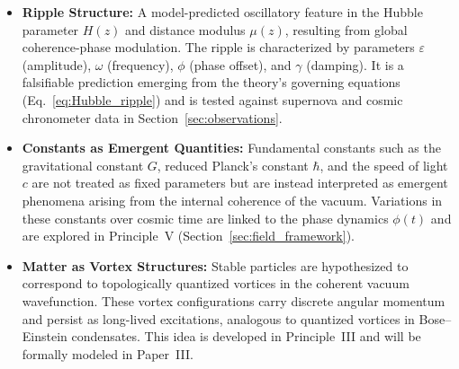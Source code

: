 \begin{itemize}[leftmargin=*]
    \item \textbf{Ripple Structure:} A model-predicted oscillatory feature in the Hubble parameter \( H(z) \) and distance modulus \( \mu(z) \), resulting from global coherence-phase modulation. The ripple is characterized by parameters \( \varepsilon \) (amplitude), \( \omega \) (frequency), \( \phi \) (phase offset), and \( \gamma \) (damping). It is a falsifiable prediction emerging from the theory's governing equations (Eq.~\eqref{eq:Hubble_ripple}) and is tested against supernova and cosmic chronometer data in Section~\ref{sec:observations}.

    \item \textbf{Constants as Emergent Quantities:} Fundamental constants such as the gravitational constant \( G \), reduced Planck’s constant \( \hbar \), and the speed of light \( c \) are not treated as fixed parameters but are instead interpreted as emergent phenomena arising from the internal coherence of the vacuum. Variations in these constants over cosmic time are linked to the phase dynamics \( \phi(t) \) and are explored in Principle~V (Section~\ref{sec:field_framework}).

    \item \textbf{Matter as Vortex Structures:} Stable particles are hypothesized to correspond to topologically quantized vortices in the coherent vacuum wavefunction. These vortex configurations carry discrete angular momentum and persist as long-lived excitations, analogous to quantized vortices in Bose–Einstein condensates. This idea is developed in Principle~III and will be formally modeled in Paper~III.

\end{itemize}
